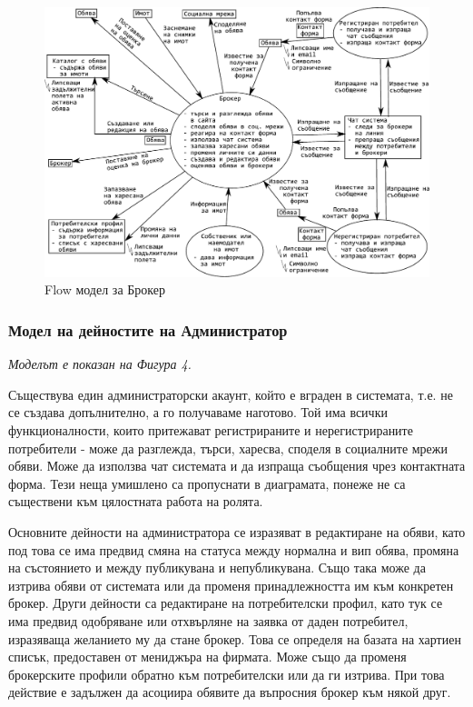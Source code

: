 \documentclass[a4paper]{article}
\begin{document}
	\begin{figure}[h]
	\centering
	\includegraphics[scale=0.85]{flow-broker}
	\caption{Flow модел за Брокер}
	\end{figure}

\subsubsection{Модел на дейностите на Администратор}

\emph{Моделът е показан на Фигура 4.} 

Съществува един администраторски акаунт, който е вграден в системата, т.е. не се създава допълнително, а го получаваме наготово. Той има всички функционалности, които притежават регистрираните и нерегистрираните потребители - може да разглежда, търси, харесва, споделя в социалните мрежи обяви. Може да използва чат системата и да изпраща съобщения чрез контактната форма. Тези неща умишлено са пропуснати в диаграмата, понеже не са съществени към цялостната работа на ролята.

Основните дейности на администратора се изразяват в редактиране на обяви, като под това се има предвид смяна на статуса между нормална и вип обява, промяна на състоянието и между публикувана и непубликувана. Също така може да изтрива обяви от системата или да променя принадлежността им към конкретен брокер. Други дейности са редактиране на потребителски профил, като тук се има предвид одобряване или отхвърляне на заявка от даден потребител, изразяваща желанието му да стане брокер. Това се определя на базата на хартиен списък, предоставен от мениджъра на фирмата. Може също да променя брокерските профили обратно към потребителски или да ги изтрива. При това действие е задължен да асоциира обявите да въпросния брокер към някой друг.
\end{document}
